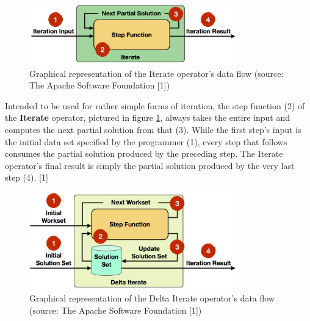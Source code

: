 
\begin{figure}[h]
	\centering
	\includegraphics[width=0.8\textwidth]{images/iterations_iterate_operator}
	\caption{Graphical representation of the Iterate operator's data flow (source: 
	The Apache Software Foundation [1])}
	\label{fig:iterate_operator}
\end{figure}

Intended to be used for rather simple forms of iteration, the step function (2) of the 
\textbf{Iterate} operator, pictured in figure \ref{fig:iterate_operator}, always takes the 
entire input and computes the next partial solution from that (3). While the first step's input 
is the initial data set specified by the programmer (1), every step that follows consumes the 
partial solution produced by the preceding step. The Iterate operator's final result is simply 
the partial solution produced by the very last step (4). [1]


\begin{figure}[h]
	\centering
	\includegraphics[width=0.8\textwidth]{images/iterations_delta_iterate_operator}
	\caption{Graphical representation of the Delta Iterate operator's data flow (source: 
	The Apache Software Foundation [1])}
	\label{fig:delta_iterate_operator}
\end{figure}

